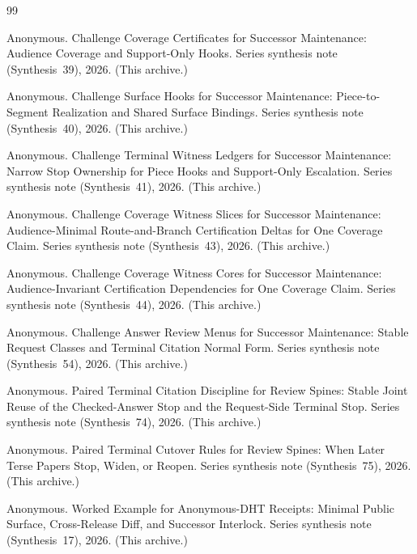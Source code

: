 \documentclass[11pt]{article}
\begin{document}
\begin{thebibliography}{99}\small

Anonymous.
\newblock Challenge Coverage Certificates for Successor Maintenance: Audience Coverage and Support-Only Hooks.
\newblock Series synthesis note (Synthesis~39), 2026. (This archive.)

Anonymous.
\newblock Challenge Surface Hooks for Successor Maintenance: Piece-to-Segment Realization and Shared Surface Bindings.
\newblock Series synthesis note (Synthesis~40), 2026. (This archive.)

Anonymous.
\newblock Challenge Terminal Witness Ledgers for Successor Maintenance: Narrow Stop Ownership for Piece Hooks and Support-Only Escalation.
\newblock Series synthesis note (Synthesis~41), 2026. (This archive.)

Anonymous.
\newblock Challenge Coverage Witness Slices for Successor Maintenance: Audience-Minimal Route-and-Branch Certification Deltas for One Coverage Claim.
\newblock Series synthesis note (Synthesis~43), 2026. (This archive.)

Anonymous.
\newblock Challenge Coverage Witness Cores for Successor Maintenance: Audience-Invariant Certification Dependencies for One Coverage Claim.
\newblock Series synthesis note (Synthesis~44), 2026. (This archive.)

Anonymous.
\newblock Challenge Answer Review Menus for Successor Maintenance: Stable Request Classes and Terminal Citation Normal Form.
\newblock Series synthesis note (Synthesis~54), 2026. (This archive.)

Anonymous.
\newblock Paired Terminal Citation Discipline for Review Spines: Stable Joint Reuse of the Checked-Answer Stop and the Request-Side Terminal Stop.
\newblock Series synthesis note (Synthesis~74), 2026. (This archive.)

Anonymous.
\newblock Paired Terminal Cutover Rules for Review Spines: When Later Terse Papers Stop, Widen, or Reopen.
\newblock Series synthesis note (Synthesis~75), 2026. (This archive.)

Anonymous.
\newblock Worked Example for Anonymous-DHT Receipts: Minimal Public Surface, Cross-Release Diff, and Successor Interlock.
\newblock Series synthesis note (Synthesis~17), 2026. (This archive.)

\end{thebibliography}
\end{document}
